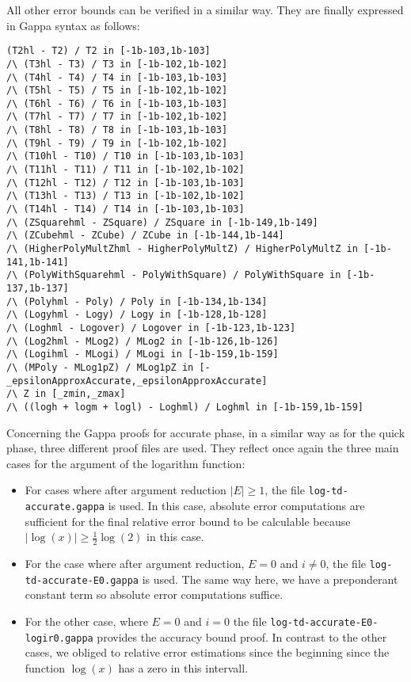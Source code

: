 All other error bounds can be verified in a similar way. They are finally expressed in Gappa syntax as follows:
\begin{lstlisting}[caption={Relative error bounds in Gappa code},firstnumber=139]
(T2hl - T2) / T2 in [-1b-103,1b-103]
/\ (T3hl - T3) / T3 in [-1b-102,1b-102]
/\ (T4hl - T4) / T4 in [-1b-103,1b-103]
/\ (T5hl - T5) / T5 in [-1b-102,1b-102]
/\ (T6hl - T6) / T6 in [-1b-103,1b-103]
/\ (T7hl - T7) / T7 in [-1b-102,1b-102]
/\ (T8hl - T8) / T8 in [-1b-103,1b-103]
/\ (T9hl - T9) / T9 in [-1b-102,1b-102]
/\ (T10hl - T10) / T10 in [-1b-103,1b-103]
/\ (T11hl - T11) / T11 in [-1b-102,1b-102]
/\ (T12hl - T12) / T12 in [-1b-103,1b-103]
/\ (T13hl - T13) / T13 in [-1b-102,1b-102]
/\ (T14hl - T14) / T14 in [-1b-103,1b-103]
/\ (ZSquarehml - ZSquare) / ZSquare in [-1b-149,1b-149]
/\ (ZCubehml - ZCube) / ZCube in [-1b-144,1b-144]
/\ (HigherPolyMultZhml - HigherPolyMultZ) / HigherPolyMultZ in [-1b-141,1b-141]
/\ (PolyWithSquarehml - PolyWithSquare) / PolyWithSquare in [-1b-137,1b-137]
/\ (Polyhml - Poly) / Poly in [-1b-134,1b-134]
/\ (Logyhml - Logy) / Logy in [-1b-128,1b-128]
/\ (Loghml - Logover) / Logover in [-1b-123,1b-123]
/\ (Log2hml - MLog2) / MLog2 in [-1b-126,1b-126]
/\ (Logihml - MLogi) / MLogi in [-1b-159,1b-159]
/\ (MPoly - MLog1pZ) / MLog1pZ in [-_epsilonApproxAccurate,_epsilonApproxAccurate]
/\ Z in [_zmin,_zmax]
/\ ((logh + logm + logl) - Loghml) / Loghml in [-1b-159,1b-159]
\end{lstlisting}
Concerning the Gappa proofs for accurate phase, in a similar way as for the quick phase, three different proof
files are used. They reflect once again the three main cases for the argument of the logarithm function:
\begin{itemize}
\item For cases where after argument reduction $\left \vert E \right \vert \geq 1$, 
the file {\tt log-td-accurate.gappa} is used. In this case, absolute error computations are sufficient 
for the final relative error bound to be calculable because 
$\left \vert \log\left( x \right) \right \vert \geq \frac{1}{2} \log\left( 2 \right)$ in this case.
\item For the case where after argument reduction, $E = 0$ and $i \not = 0$, the file 
{\tt log-td-accurate-E0.gappa} is used. The same way here, we have a preponderant constant term so absolute
error computations suffice.
\item For the other case, where $E=0$ and $i=0$ the file {\tt log-td-accurate-E0-logir0.gappa} provides the 
accuracy bound proof. In contrast to the other cases, we obliged to relative error estimations since the beginning
since the function $\log\left( x \right)$ has a zero in this intervall.
\end{itemize}
